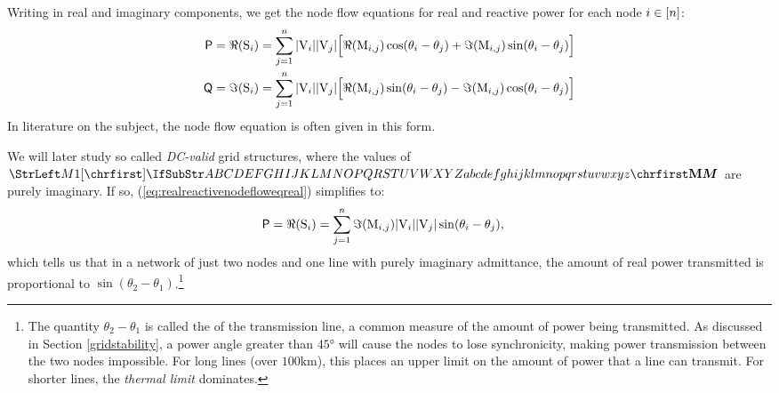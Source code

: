 \documentclass[main.tex]{subfiles}
\begin{document}
\begin{remark}
Writing in real and imaginary components, we get the node flow equations for real and reactive power for each node $i \in [n]$:
\begin{align}
    \mathsf{P}=\Re ({\mathrm{S}}_i) &= \sum_{j=1}^{n} |{\mathrm{V}}_i| |{\mathrm{V}}_{j}| \Big[\Re({\mathrm{M}}_{i,j})\cos(\theta_i - \theta_j)+\Im({\mathrm{M}}_{i,j})\sin(\theta_i - \theta_j)\Big]
    \label{eq:realreactivenodefloweqreal}
    \\
    \mathsf{Q}=\Im ({\mathrm{S}}_i) &= \sum_{j=1}^{n} |{\mathrm{V}}_i| |{\mathrm{V}}_{j}|\Big[\Re({\mathrm{M}}_{i,j})\sin(\theta_i - \theta_j)-\Im({\mathrm{M}}_{i,j})\cos(\theta_i - \theta_j)\Big]
    \label{eq:realreactivenodefloweqreactive}
\end{align}
In literature on the subject, the node flow equation is often given in this form.

We will later study so called \emph{DC-valid} grid structures, where the values of $\mat{M}$ are purely imaginary. If so, (\ref{eq:realreactivenodefloweqreal}) simplifies to:
\begin{align*}
    \mathsf{P}=\Re ({\mathrm{S}}_i) &= \sum_{j=1}^{n} \Im({\mathrm{M}}_{i,j}) |{\mathrm{V}}_i| |{\mathrm{V}}_{j}| \sin(\theta_i - \theta_j),
\end{align*}
which tells us that in a network of just two nodes and one line with purely imaginary admittance, the amount of real power transmitted is proportional to $\sin (\theta_2-\theta_1)$.\footnote{The quantity $\theta_2 - \theta_1$ is called the  of the transmission line, a common measure of the amount of power being transmitted. As discussed in Section \ref{gridstability}, a power angle greater than $45\si{\degree}$ will cause the nodes to lose synchronicity, making power transmission between the two nodes impossible. For long lines (over $100\si{\kilo\meter}$), this  places an upper limit on the amount of power that a line can transmit. For shorter lines, the \emph{thermal limit} dominates.}


\end{remark}
\end{document}
